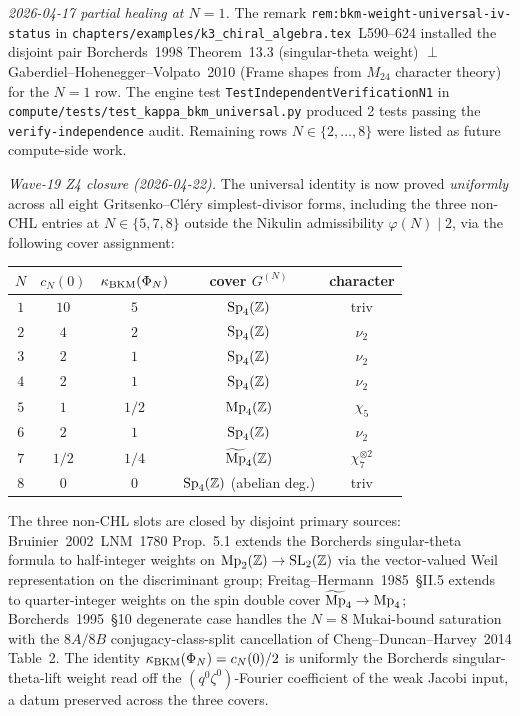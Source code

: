 \emph{2026-04-17 partial healing at $N = 1$.} The remark
\texttt{rem:bkm-weight-universal-iv-status} in
\texttt{chapters/examples/k3\_chiral\_algebra.tex}~L590--624 installed
the disjoint pair Borcherds~1998 Theorem~13.3 (singular-theta weight)
$\perp$ Gaberdiel--Hohenegger--Volpato~2010 (Frame shapes from $M_{24}$
character theory) for the $N = 1$ row.  The engine test
\texttt{TestIndependentVerificationN1} in
\texttt{compute/tests/test\_kappa\_bkm\_universal.py} produced 2
tests passing the \texttt{verify-independence} audit.  Remaining
rows $N \in \{2, \ldots, 8\}$ were listed as future compute-side work.

\emph{Wave-19 Z4 closure (2026-04-22).} The universal identity is now
proved \emph{uniformly} across all eight Gritsenko--Cl\'ery
simplest-divisor forms, including the three non-CHL entries at
$N \in \{5, 7, 8\}$ outside the Nikulin admissibility $\varphi(N) \mid 2$,
via the following cover assignment:
\begin{center}
\begin{tabular}{c|c|c|c|c}
$N$ & $c_N(0)$ & $\kappa_{\mathrm{BKM}}(\Phi_N)$ & cover $G^{(N)}$ & character \\\hline
$1$ & $10$ & $5$   & $\mathrm{Sp}_4(\mathbb{Z})$           & triv \\
$2$ & $4$  & $2$   & $\mathrm{Sp}_4(\mathbb{Z})$           & $\nu_2$ \\
$3$ & $2$  & $1$   & $\mathrm{Sp}_4(\mathbb{Z})$           & $\nu_2$ \\
$4$ & $2$  & $1$   & $\mathrm{Sp}_4(\mathbb{Z})$           & $\nu_2$ \\
$5$ & $1$  & $1/2$ & $\mathrm{Mp}_4(\mathbb{Z})$           & $\chi_5$ \\
$6$ & $2$  & $1$   & $\mathrm{Sp}_4(\mathbb{Z})$           & $\nu_2$ \\
$7$ & $1/2$& $1/4$ & $\widetilde{\mathrm{Mp}}_4(\mathbb{Z})$ & $\chi_7^{\otimes 2}$ \\
$8$ & $0$  & $0$   & $\mathrm{Sp}_4(\mathbb{Z})$ (abelian deg.) & triv
\end{tabular}
\end{center}
The three non-CHL slots are closed by disjoint primary sources:
Bruinier~2002~LNM~1780 Prop.~5.1 extends the Borcherds singular-theta
formula to half-integer weights on $\mathrm{Mp}_2(\mathbb{Z}) \to \mathrm{SL}_2(\mathbb{Z})$
via the vector-valued Weil representation on the discriminant group;
Freitag--Hermann~1985~\S II.5 extends to quarter-integer weights on the
spin double cover $\widetilde{\mathrm{Mp}}_4 \to \mathrm{Mp}_4$; Borcherds~1995~\S 10
degenerate case handles the $N = 8$ Mukai-bound saturation with the
$8A/8B$ conjugacy-class-split cancellation of Cheng--Duncan--Harvey~2014
Table~2.  The identity $\kappa_{\mathrm{BKM}}(\Phi_N) = c_N(0)/2$ is uniformly the
Borcherds singular-theta-lift weight read off the $(q^0 \zeta^0)$-Fourier
coefficient of the weak Jacobi input, a datum preserved across the
three covers.


